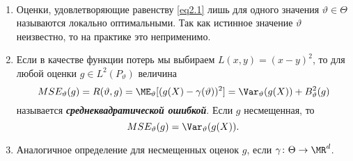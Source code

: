 \begin{rmrk} \
	\begin{enumerate}
		\item Оценки, удовлетворяющие равенству \eqref{eq2.1} лишь для одного значения $\vartheta \in \Theta$ называются локально оптимальными. Так как истинное значение $\vartheta$ неизвестно, то на практике это неприменимо. 
		\item Если в качестве функции потерь мы выбираем $L(x,y)=(x-y)^2$, то для любой оценки $g \in L^2(P_\vartheta)$ величина
		\[ MSE_\vartheta(g) = R(\vartheta, g)=\ME_\vartheta[(g(X)-\gamma(\vartheta))^2]=\Var_\vartheta(g(X))+B_\vartheta^2(g) \]
		называется \textbf{\textit{среднеквадратической ошибкой}}. Если $g$ несмещенная, то
		\[MSE_\vartheta(g)=\Var_\vartheta(g(X)). \]
		\item Аналогичное определение для несмещенных оценок $g$, если $\gamma\colon \Theta \rightarrow \MR^d$.
	\end{enumerate}
\end{rmrk}

